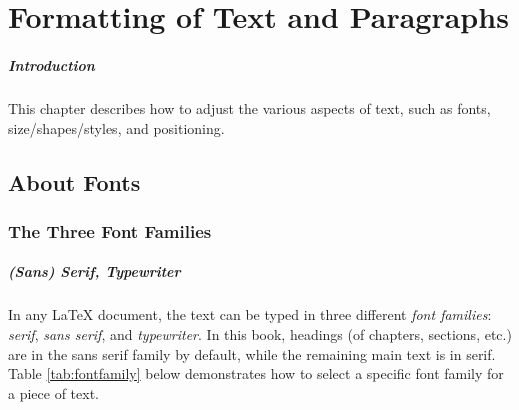 \chapter{Formatting of Text and Paragraphs}

\paragraph{Introduction}
This chapter describes how to adjust the various aspects of text, such as fonts, size/shapes/styles, and positioning.

\section{About Fonts}

\subsection{The Three Font Families}

\paragraph{(Sans) Serif, Typewriter}
In any \LaTeX{} document, the text can be typed in three different \textit{font families}: \textit{serif}, \textit{sans serif}, and \textit{typewriter}. In this book, headings (of chapters, sections, etc.) are in the sans serif family by default, while the remaining main text is in serif. Table \ref{tab:fontfamily} below demonstrates how to select a specific font family for a piece of text.

